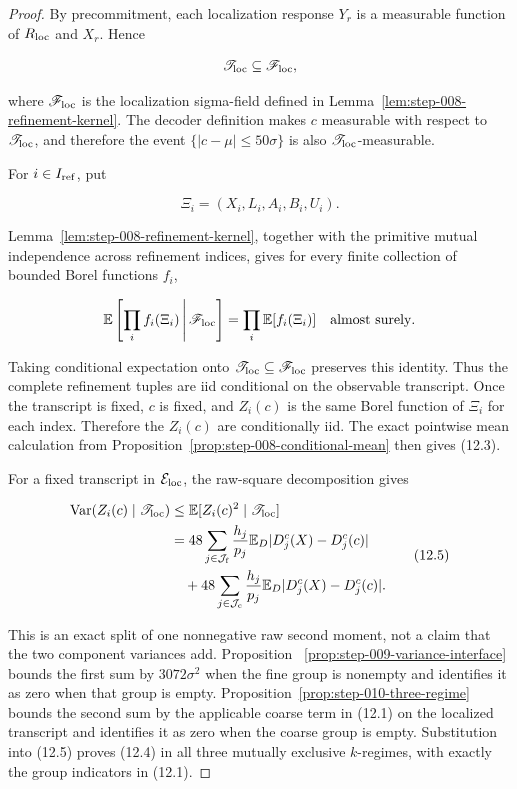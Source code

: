 \begin{proof}
By precommitment, each localization response
\(Y_r\) is a measurable function of \(R_{\rm loc}\) and \(X_r\). Hence

\[
\mathscr T_{\rm loc}\subseteq\mathscr F_{\rm loc},
\]

where \(\mathscr F_{\rm loc}\) is the localization sigma-field defined in
Lemma~\ref{lem:step-008-refinement-kernel}. The decoder definition makes
\(c\) measurable with respect to
\(\mathscr T_{\rm loc}\), and therefore the event
\(\{|c-\mu|\leq50\sigma\}\) is also
\(\mathscr T_{\rm loc}\)-measurable.

For \(i\in I_{\rm ref}\), put

\[
\Xi_i=(X_i,L_i,A_i,B_i,U_i).
\]

Lemma~\ref{lem:step-008-refinement-kernel}, together with the
primitive mutual independence across refinement indices, gives for every
finite collection of bounded Borel functions \(f_i\),

\[
\mathbb E\left[\prod_i f_i(\Xi_i)\,\middle|\,\mathscr F_{\rm loc}\right]
=\prod_i\mathbb E[f_i(\Xi_i)]
\quad\text{almost surely}.
\]

Taking conditional expectation onto
\(\mathscr T_{\rm loc}\subseteq\mathscr F_{\rm loc}\) preserves this
identity. Thus the complete refinement tuples are iid conditional on the
observable transcript. Once the transcript is fixed, \(c\) is fixed, and
\(Z_i(c)\) is the same Borel function of \(\Xi_i\) for each index. Therefore
the \(Z_i(c)\) are conditionally iid. The exact pointwise mean
calculation from Proposition~\ref{prop:step-008-conditional-mean} then
gives (12.3).

For a fixed transcript in \(\mathcal E_{\rm loc}\), the raw-square
decomposition gives

\[
\begin{aligned}
\operatorname{Var}(Z_i(c)\mid\mathscr T_{\rm loc})
&\leq
\mathbb E[Z_i(c)^2\mid\mathscr T_{\rm loc}]\\
&=
48\sum_{j\in\mathcal J_{\rm f}}\frac{h_j}{p_j}
\mathbb E_D|D_j^c(X)-D_j^c(c)|\\
&\quad+
48\sum_{j\in\mathcal J_{\rm c}}\frac{h_j}{p_j}
\mathbb E_D|D_j^c(X)-D_j^c(c)|.
\end{aligned}
\tag{12.5}
\]

This is an exact split of one nonnegative raw second moment, not a claim that
the two component variances add. Proposition~
\ref{prop:step-009-variance-interface} bounds the first sum by
\(3072\sigma^2\) when the fine group is nonempty and identifies it as zero
when that group is empty. Proposition~\ref{prop:step-010-three-regime} bounds the second sum by the
applicable coarse term in (12.1) on the localized transcript and identifies
it as zero when the coarse group is empty. Substitution into (12.5) proves
(12.4) in all three mutually exclusive \(k\)-regimes, with exactly the group
indicators in (12.1).


\end{proof}
